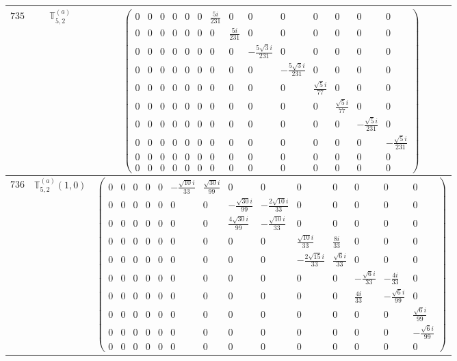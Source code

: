 \documentclass[fleqn,8pt,landscape]{jsarticle}
\begin{document}
\begin{center}
\begin{longtable}{ccc}
$ 735 $ & $ \mathbb{T}_{5,2}^{(a)} $ & $ \begin{pmatrix} 0 & 0 & 0 & 0 & 0 & 0 & \frac{5 i}{231} & 0 & 0 & 0 & 0 & 0 & 0 & 0 \\ 0 & 0 & 0 & 0 & 0 & 0 & 0 & \frac{5 i}{231} & 0 & 0 & 0 & 0 & 0 & 0 \\ 0 & 0 & 0 & 0 & 0 & 0 & 0 & 0 & - \frac{5 \sqrt{3} i}{231} & 0 & 0 & 0 & 0 & 0 \\ 0 & 0 & 0 & 0 & 0 & 0 & 0 & 0 & 0 & - \frac{5 \sqrt{3} i}{231} & 0 & 0 & 0 & 0 \\ 0 & 0 & 0 & 0 & 0 & 0 & 0 & 0 & 0 & 0 & \frac{\sqrt{5} i}{77} & 0 & 0 & 0 \\ 0 & 0 & 0 & 0 & 0 & 0 & 0 & 0 & 0 & 0 & 0 & \frac{\sqrt{5} i}{77} & 0 & 0 \\ 0 & 0 & 0 & 0 & 0 & 0 & 0 & 0 & 0 & 0 & 0 & 0 & - \frac{\sqrt{5} i}{231} & 0 \\ 0 & 0 & 0 & 0 & 0 & 0 & 0 & 0 & 0 & 0 & 0 & 0 & 0 & - \frac{\sqrt{5} i}{231} \\ 0 & 0 & 0 & 0 & 0 & 0 & 0 & 0 & 0 & 0 & 0 & 0 & 0 & 0 \\ 0 & 0 & 0 & 0 & 0 & 0 & 0 & 0 & 0 & 0 & 0 & 0 & 0 & 0 \end{pmatrix} $ \\ \hline
$ 736 $ & $ \mathbb{T}_{5,2}^{(a)}(1,0) $ & $ \begin{pmatrix} 0 & 0 & 0 & 0 & 0 & - \frac{\sqrt{10} i}{33} & \frac{\sqrt{30} i}{99} & 0 & 0 & 0 & 0 & 0 & 0 & 0 \\ 0 & 0 & 0 & 0 & 0 & 0 & 0 & - \frac{\sqrt{30} i}{99} & - \frac{2 \sqrt{10} i}{33} & 0 & 0 & 0 & 0 & 0 \\ 0 & 0 & 0 & 0 & 0 & 0 & 0 & \frac{4 \sqrt{30} i}{99} & - \frac{\sqrt{10} i}{33} & 0 & 0 & 0 & 0 & 0 \\ 0 & 0 & 0 & 0 & 0 & 0 & 0 & 0 & 0 & \frac{\sqrt{10} i}{33} & \frac{8 i}{33} & 0 & 0 & 0 \\ 0 & 0 & 0 & 0 & 0 & 0 & 0 & 0 & 0 & - \frac{2 \sqrt{15} i}{33} & \frac{\sqrt{6} i}{33} & 0 & 0 & 0 \\ 0 & 0 & 0 & 0 & 0 & 0 & 0 & 0 & 0 & 0 & 0 & - \frac{\sqrt{6} i}{33} & - \frac{4 i}{33} & 0 \\ 0 & 0 & 0 & 0 & 0 & 0 & 0 & 0 & 0 & 0 & 0 & \frac{4 i}{33} & - \frac{\sqrt{6} i}{99} & 0 \\ 0 & 0 & 0 & 0 & 0 & 0 & 0 & 0 & 0 & 0 & 0 & 0 & 0 & \frac{\sqrt{6} i}{99} \\ 0 & 0 & 0 & 0 & 0 & 0 & 0 & 0 & 0 & 0 & 0 & 0 & 0 & - \frac{\sqrt{6} i}{99} \\ 0 & 0 & 0 & 0 & 0 & 0 & 0 & 0 & 0 & 0 & 0 & 0 & 0 & 0 \end{pmatrix} $ \\ \hline

\end{longtable}
\end{center}
\end{document}
